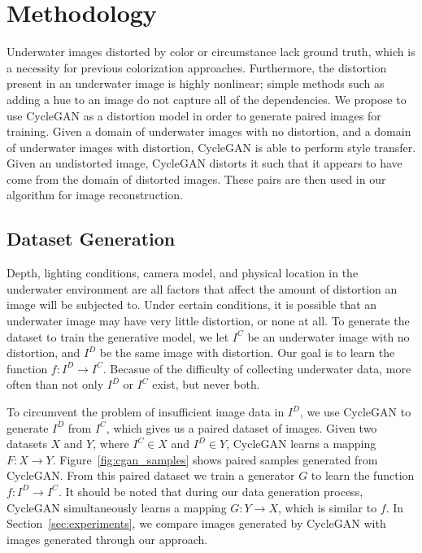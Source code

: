 \section{Methodology}
\label{sec:methodology}
Underwater images distorted by color or circumstance lack ground truth, which is a necessity for previous colorization
approaches. Furthermore, the distortion present in an underwater image is highly nonlinear; simple methods such as
adding a hue to an image do not capture all of the dependencies. We propose to use CycleGAN as a distortion model in
order to generate paired images for training. Given a domain of underwater images with no distortion, and a domain of
underwater images with distortion, CycleGAN is able to perform style transfer. Given an undistorted image, CycleGAN
distorts it such that it appears to have come from the domain of distorted images. These pairs are then used in our
algorithm for image reconstruction.

\subsection{Dataset Generation}
Depth, lighting conditions, camera model, and physical location in the underwater environment are all factors that affect the 
amount of distortion an image will be subjected to. Under certain conditions, it is possible that an underwater image may have 
very little distortion, or none at all. To generate the dataset to train the generative model, we let 
$I^C$ be an underwater image with no distortion, and $I^D$ be the same image with distortion. Our goal is to learn the function 
$f: I^D \rightarrow I^C$. Becasue of the difficulty of collecting underwater data, more often than not only $I^D$ or $I^C$ exist, 
but never both.

To circumvent the problem of insufficient image data in $I^D$, we use CycleGAN to generate $I^D$ from $I^C$, which gives us a 
paired dataset of images. Given two datasets $X$ and $Y$, where $I^C \in X$ and $I^D \in Y$, CycleGAN learns a mapping $F: X 
\rightarrow Y$. Figure~\ref{fig:cgan_samples} shows paired samples generated from CycleGAN. From this paired dataset we train a 
generator $G$ to learn the function $f: I^D \rightarrow I^C$. It should be noted that during our data generation process, CycleGAN 
simultaneously learns a mapping $G: Y \rightarrow X$, which is similar to $f$. In Section~\ref{sec:experiments}, we compare images 
generated by CycleGAN with images generated through our approach.

